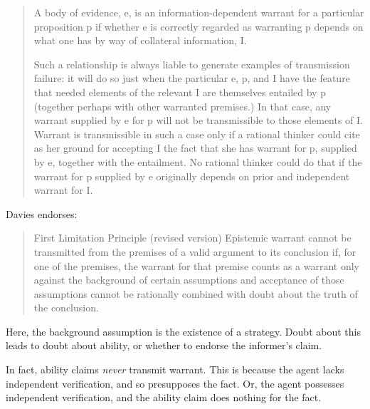\documentclass[10pt]{article}
\begin{document}
\begin{quote}
  A body of evidence, e, is an information-dependent warrant for a particular proposition p if whether e is correctly regarded as warranting p depends on what one has by way of collateral information, I.

  Such a relationship is always liable to generate examples of transmission failure:
  it will do so just when the particular e, p, and I have the feature that needed elements of the relevant I are themselves entailed by p (together perhaps with other warranted premises.)
  In that case, any warrant supplied by e for p will not be transmissible to those elements of I.
  Warrant is transmissible in such a case only if a rational thinker could cite as her ground for accepting I the fact that she has warrant for p, supplied by e, together with the entailment.
  No rational thinker could do that if the warrant for p supplied by e originally depends on prior and independent warrant for I.
\end{quote}

Davies endorses:
\begin{quote}
  First Limitation Principle (revised version) Epistemic warrant cannot be transmitted from the premises of a valid argument to its conclusion if, for one of the premises, the warrant for that premise counts as a warrant only against the background of certain assumptions and acceptance of those assumptions cannot be rationally combined with doubt about the truth of the conclusion.
\end{quote}
Here, the background assumption is the existence of a strategy.
Doubt about this leads to doubt about ability, or whether to endorse the informer's claim.

In fact, ability claims \emph{never} transmit warrant.
This is because the agent lacks independent verification, and so presupposes the fact.
Or, the agent possesses independent verification, and the ability claim does nothing for the fact.
\end{document}

